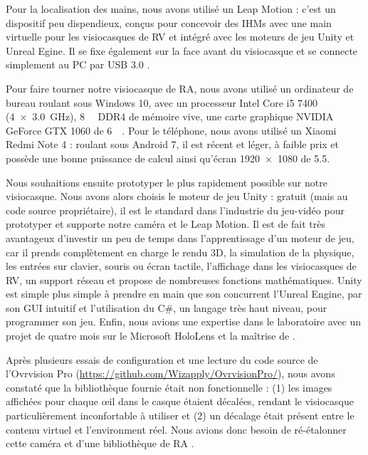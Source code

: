 Pour la localisation des mains, nous avons utilisé un Leap Motion : c'est un dispositif peu dispendieux, conçus pour concevoir des IHMs avec une main virtuelle pour les visiocasques de RV et intégré avec les moteurs de jeu Unity et Unreal Egine. Il se fixe également sur la face avant du visiocasque et se connecte simplement au PC par USB 3.0 .

Pour faire tourner notre visiocasque de RA, nous avons utilisé un ordinateur de bureau roulant sous Windows 10, avec un processeur Intel Core i5 7400 (\SI[product-units = single]{4x3.0}{\GHz}), \SI{8}{\giga\byte} DDR4 de mémoire vive, une carte graphique NVIDIA GeForce GTX 1060 de \SI{6}{\giga\byte}. Pour le téléphone, nous avons utilisé un Xiaomi Redmi Note 4 : roulant sous Android 7, il est récent et léger, à faible prix et possède une bonne puissance de calcul ainsi qu'écran \SI{1920x1080}{\px} de \SI{5.5}{\inch}.

Nous souhaitions ensuite prototyper le plus rapidement possible sur notre visiocasque. Nous avons alors choisis le moteur de jeu Unity : gratuit (mais au code source propriétaire), il est le standard dans l'industrie du jeu-vidéo pour prototyper et supporte notre caméra et le Leap Motion. Il est de fait très avantageux d'investir un peu de temps dans l'apprentissage d'un moteur de jeu, car il prends complètement en charge le rendu 3D, la simulation de la physique, les entrées sur clavier, souris ou écran tactile, l'affichage dans les visiocasques de RV, un support réseau et propose de nombreuses fonctions mathématiques. Unity est simple plus simple à prendre en main que son concurrent l'Unreal Engine, par son GUI intuitif et l'utilisation du C\#, un langage très haut niveau, pour programmer son jeu. Enfin, nous avions une expertise dans le laboratoire avec un projet de quatre mois sur le Microsoft HoloLens et la maîtrise de \cite{Millette2016}.

Après plusieurs essais de configuration et une lecture du code source de l'Ovrvision Pro (\url{https://github.com/Wizapply/OvrvisionPro/}), nous avons constaté que la bibliothèque fournie était non fonctionnelle : (1) les images affichées pour chaque \oe il dans le casque étaient décalées, rendant le visiocasque particulièrement inconfortable à utiliser et (2) un décalage était présent entre le contenu virtuel et l'environment réel. Nous avions donc besoin de ré-étalonner cette caméra  et d'une bibliothèque de RA .

